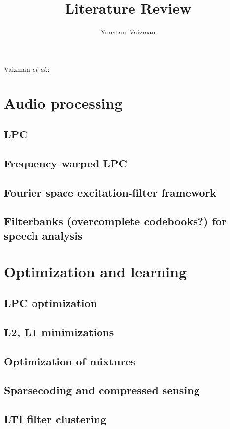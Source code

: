 \documentclass[journal]{IEEEtran}
\begin{document}
%
\title{Literature Review}
\author{Yonatan~Vaizman}

\markboth{}%
{Vaizman \MakeLowercase{\textit{et al.}}: }

\maketitle



\section{Audio processing}


\subsection{LPC}
\subsection{Frequency-warped LPC}
\subsection{Fourier space excitation-filter framework}
\subsection{Filterbanks (overcomplete codebooks?) for speech analysis}

\section{Optimization and learning}
\subsection{LPC optimization}
\subsection{L2, L1 minimizations}
\subsection{Optimization of mixtures}
\subsection{Sparsecoding and compressed sensing}
\subsection{LTI filter clustering}
\end{document}
